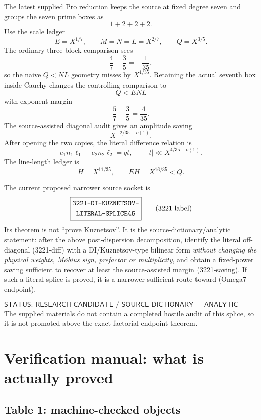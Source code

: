 \documentclass[11pt]{article}
\theoremstyle{definition}
\newcommand{\1}{\mathbf 1}
\newcommand{\status}[1]{\textsf{#1}}
\begin{document}
The latest supplied Pro reduction keeps the source at fixed degree seven and groups the
seven prime boxes as
\[
\boxed{1+2+2+2.}
\]
Use the scale ledger
\[
\boxed{
E=X^{1/7},\qquad
M=N=L=X^{2/7},\qquad
Q=X^{3/5}.
}
\tag{3221-scales}
\]
The ordinary three-block comparison sees
\[
\frac47-\frac35=-\frac1{35},
\]
so the naive $Q<NL$ geometry misses by $X^{1/35}$.
Retaining the actual seventh box inside Cauchy changes the controlling comparison to
\[
\boxed{Q<ENL}
\]
with exponent margin
\[
\boxed{\frac57-\frac35=\frac4{35}.}
\tag{3221-margin}
\]
The source-assisted diagonal audit gives an amplitude saving
\[
\boxed{X^{-2/35+o(1)}.}
\tag{3221-saving}
\]
After opening the two copies, the literal difference relation is
\[
\boxed{
e_1n_1\ell_1-e_2n_2\ell_2=qt,
\qquad
|t|\ll X^{4/35+o(1)}.
}
\tag{3221-diff}
\]
The line-length ledger is
\[
\boxed{
H=X^{11/35},
\qquad
EH=X^{16/35}<Q.
}
\tag{3221-H}
\]

The current proposed narrower source socket is
\[
\boxed{\begin{gathered}\text{\ttfamily 3221-DI-KUZNETSOV-}\\\text{\ttfamily LITERAL-SPLICE45}\end{gathered}}
\tag{3221-label}
\]
Its theorem is not ``prove Kuznetsov''.  It is the source-dictionary/analytic statement:
after the above post-dispersion decomposition, identify the literal off-diagonal
(3221-diff) with a DI/Kuznetsov-type bilinear form \emph{without changing the physical
weights, M\"obius sign, prefactor or multiplicity}, and obtain a fixed-power saving sufficient
to recover at least the source-assisted margin (3221-saving).  If such a literal splice
is proved, it is a narrower sufficient route toward (Omega7-endpoint).

\[
\status{STATUS: RESEARCH CANDIDATE / SOURCE-DICTIONARY + ANALYTIC OPEN.}
\]
The supplied materials do not contain a completed hostile audit of this splice, so it is not
promoted above the exact factorial endpoint theorem.

\section{Verification manual: what is actually proved}
\label{sec:verification-manual}

\subsection{Table 1: machine-checked objects}
\end{document}

